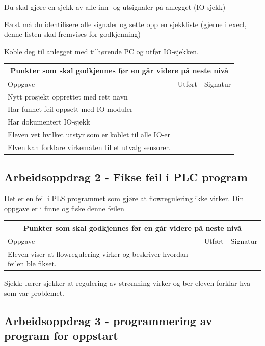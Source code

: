 Du skal gjøre en sjekk av alle inn- og utsignaler på anlegget (IO-sjekk)

Først må du identifisere alle signaler og sette opp en sjekkliste
(gjerne i execl, denne listen skal fremvises for godkjenning)

Koble deg til anlegget med tilhørende PC og utfør IO-sjekken. 


\begin{center}
\begin{tabular}{ | m{8cm} | m{1cm}| m{2cm} | } 
\hline
\multicolumn{3}{|c|}{Punkter som skal godkjennes før en går videre på neste nivå} \\
	\hline
	Oppgave	& Utført & Signatur \\ 
	\hline
	\hline
Nytt prosjekt opprettet med rett navn	& & \\ 
	\hline
Har funnet feil oppsett med IO-moduler	& & \\ 
	\hline
Har dokumentert IO-sjekk	& & \\ 
	\hline
Eleven vet hvilket utstyr som er koblet til alle IO-er	& & \\ 
	\hline
Elven kan forklare virkemåten til et utvalg sensorer.	& & \\ 
	\hline
\end{tabular}
\end{center}
\newpage
\subsection*{Arbeidsoppdrag 2 - Fikse feil i PLC program}

Det er en feil i PLS programmet som gjøre at flowregulering ikke virker. Din oppgave er i finne og fiske denne feilen


\begin{center}
\begin{tabular}{ | m{8cm} | m{1cm}| m{2cm} | } 
\hline
\multicolumn{3}{|c|}{Punkter som skal godkjennes før en går videre på neste nivå} \\
	\hline
	Oppgave	& Utført & Signatur \\ 
	\hline
Eleven viser at flowregulering virker og beskriver hvordan feilen ble fikset. & & \\ 
	\hline
\end{tabular}
\end{center}
Sjekk: lærer sjekker at regulering av strømning virker og ber eleven forklar hva som var problemet.
\newpage
\subsection*{Arbeidsoppdrag 3 - programmering av program for oppstart}

